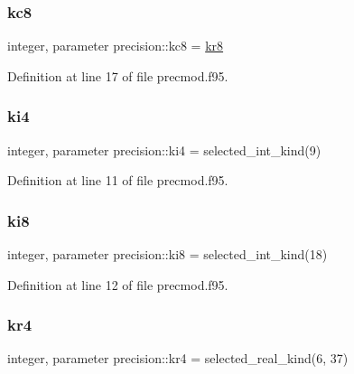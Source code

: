 \mbox{\label{namespaceprecision_a2093064d9b44820731402869509b1a0d}} 
\subsubsection{\texorpdfstring{kc8}{kc8}}
{\footnotesize\ttfamily integer, parameter precision\+::kc8 = \hyperlink{namespaceprecision_a4b30cd5919aba1303b7b752110b57254}{kr8}}



Definition at line 17 of file precmod.\+f95.

\mbox{\label{namespaceprecision_a7b97657c46b1524ed5f73ffc1226dc08}} 
\subsubsection{\texorpdfstring{ki4}{ki4}}
{\footnotesize\ttfamily integer, parameter precision\+::ki4 = selected\+\_\+int\+\_\+kind(9)}



Definition at line 11 of file precmod.\+f95.

\mbox{\label{namespaceprecision_a25d156062c1ee160ed75a5a6dced7ceb}} 
\subsubsection{\texorpdfstring{ki8}{ki8}}
{\footnotesize\ttfamily integer, parameter precision\+::ki8 = selected\+\_\+int\+\_\+kind(18)}



Definition at line 12 of file precmod.\+f95.

\mbox{\label{namespaceprecision_ae184f50eb0c9c763233e9c5d34b8034a}} 
\subsubsection{\texorpdfstring{kr4}{kr4}}
{\footnotesize\ttfamily integer, parameter precision\+::kr4 = selected\+\_\+real\+\_\+kind(6, 37)}



